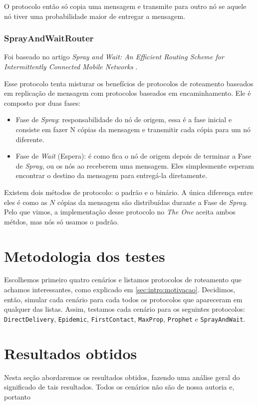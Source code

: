 \documentclass[conference]{IEEEtran}
\begin{document}
O protocolo então só copia uma mensagem e transmite para outro nó se aquele nó tiver uma probabilidade maior de entregar a mensagem.

\subsubsection{SprayAndWaitRouter}
Foi baseado no artigo \textit{Spray and Wait: An Efficient Routing Scheme for Intermittently Connected Mobile Networks} \cite{SprayAndWaitRouter:original}.

Esse protocolo tenta misturar os benefícios de protocolos de roteamento baseados em replicação de mensagem com protocolos baseados em encaminhamento. Ele é composto por duas fases:
\begin{itemize}
  \item Fase de \textit{Spray}: responsabilidade do nó de origem, essa é a fase inicial e consiste em fazer N cópias da mensagem e transmitir cada cópia para um nó diferente.
  \item Fase de \textit{Wait} (Espera): é como fica o nó de origem depois de terminar a Fase de \textit{Spray}, ou os nós ao receberem uma mensagem. Eles simplesmente esperam encontrar o destino da mensagem para entregá-la diretamente.
\end{itemize}

Existem dois métodos de protocolo: o padrão e o binário. A única diferença entre eles é como as $N$ cópias da mensagem são distribuídas durante a Fase de \textit{Spray}. Pelo que vimos, a implementação desse protocolo no \emph{The One} aceita ambos métdos, mas nós só usamos o padrão.

\section{Metodologia dos testes}
Escolhemos primeiro quatro cenários e listamos protocolos de roteamento que achamos interessantes, como explicado em \ref{sec:intro:motivacao}. Decidimos, então, simular cada cenário para cada todos os protocolos que apareceram em qualquer das listas. Assim, testamos cada cenário para os seguintes protocolos: \texttt{DirectDelivery}, \texttt{Epidemic}, \texttt{FirstContact}, \texttt{MaxProp}, \texttt{Prophet} e \texttt{SprayAndWait}.


\section{Resultados obtidos}
Nesta seção abordaremos os resultados obtidos, fazendo uma análise geral do significado de tais resultados. Todos os cenários não são de nossa autoria e, portanto 
\end{document}
